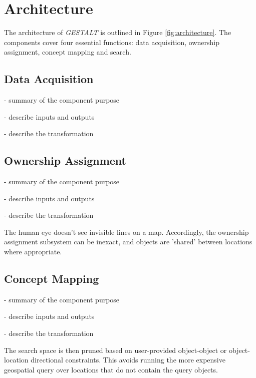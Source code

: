 \section{Architecture}
\label{section:architecture}

\begin{figure*}[t]
    
    \centering
    \caption[width=\textwidth]{The architecture of \emph{GESTALT} consists of the data collection subsystem, the ownership assignment process, the concept mapping process and the search subsystem.}
    \label{fig:architecture}
\end{figure*}

The architecture of \textit{GESTALT} is outlined in Figure \ref{fig:architecture}. The components cover four essential functions: data acquisition, ownership assignment, concept mapping and search. 

\subsection{Data Acquisition}
- summary of the component purpose

- describe inputs and outputs

- describe the transformation


\subsection{Ownership Assignment}
- summary of the component purpose

- describe inputs and outputs

- describe the transformation

The human eye doesn't see invisible lines on a map. Accordingly, the ownership assignment subsystem can be inexact, and objects are 'shared' between locations where appropriate. 


\subsection{Concept Mapping}
- summary of the component purpose

- describe inputs and outputs

- describe the transformation

The search space is then pruned based on user-provided object-object or object-location directional constraints.
This avoids running the more expensive geospatial query over locations that do not contain the query objects.


